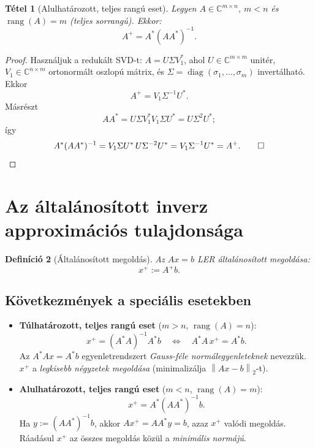 \documentclass[a4paper,12pt]{article}
\theoremstyle{mydef}
\newtheorem{tetel}{Tétel}[section]
\newtheorem{definicio}[tetel]{Definíció}
\newcommand{\C}{\mathbb{C}}
\newcommand{\norm}[1]{\left\|#1\right\|}
\DeclareMathOperator{\rang}{rang}
\DeclareMathOperator{\diag}{diag}
\begin{document}
\begin{mdframed}[backgroundcolor=thmbg,linewidth=0pt,innertopmargin=8pt,innerbottommargin=8pt]
\begin{tetel}[Alulhatározott, teljes rangú eset]
\label{tetel:alulhatarozottPS}
Legyen $A \in \C^{m\times n}$, $m < n$ és $\rang(A) = m$ (teljes sorrangú). Ekkor:
\[
  A^+ = A^*(AA^*)^{-1}.
\]
\end{tetel}
\end{mdframed}

\begin{proof}
Használjuk a redukált SVD-t: $A=U\Sigma V_1^*$, ahol
$U\in\C^{m\times m}$ unitér, $V_1\in\C^{n\times m}$ ortonormált oszlopú mátrix,
és $\Sigma=\diag(\sigma_1,\ldots,\sigma_m)$ invertálható. Ekkor
\[
  A^+ = V_1\Sigma^{-1}U^*.
\]
Másrészt
\[
  AA^* = U\Sigma V_1^*V_1\Sigma U^* = U\Sigma^2U^*;
\]
így
\[
  A^*(AA^*)^{-1}
  = V_1\Sigma U^*\,U\Sigma^{-2}U^*
  = V_1\Sigma^{-1}U^* = A^+. \qed
\]
\end{proof}

\section{Az általánosított inverz approximációs tulajdonsága}
\label{sec:approx}

\begin{mdframed}[backgroundcolor=defbg,linewidth=0pt,innertopmargin=8pt,innerbottommargin=8pt]
\begin{definicio}[Általánosított megoldás]
Az $Ax = b$ LER általánosított megoldása:
\[
  x^+ := A^+ b.
\]
\end{definicio}
\end{mdframed}

\subsection*{Következmények a speciális esetekben}

\begin{itemize}
  \item \textbf{Túlhatározott, teljes rangú eset} ($m > n$, $\rang(A) = n$):
    \[
      x^+ = (A^*A)^{-1}A^*b \quad \Longleftrightarrow \quad A^*A\,x^+ = A^*b.
    \]
    Az $A^*Ax = A^*b$ egyenletrendszert \emph{Gauss-féle normálegyenleteknek} nevezzük.
    $x^+$ a \emph{legkisebb négyzetek megoldása} (minimalizálja $\norm{Ax - b}_2$-t).

  \item \textbf{Alulhatározott, teljes rangú eset} ($m < n$, $\rang(A) = m$):
    \[
      x^+ = A^*(AA^*)^{-1}b.
    \]
    Ha $y := (AA^*)^{-1}b$, akkor $Ax^+ = AA^*y = b$, azaz $x^+$ valódi megoldás.
    Ráadásul $x^+$ az összes megoldás közül a \emph{minimális normájú}.
\end{itemize}
\end{document}
